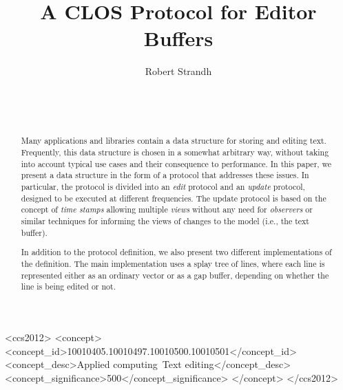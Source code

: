 \documentclass{sig-alternate-05-2015}
\def\inputtex#1{}
\begin{document}
\title{A CLOS Protocol for Editor Buffers}
\author{\alignauthor
Robert Strandh\\
\\
\\
\\
}

\maketitle

\begin{abstract}
Many applications and libraries contain a data structure for storing
and editing text.  Frequently, this data structure is chosen in a
somewhat arbitrary way, without taking into account typical use cases
and their consequence to performance.  In this paper, we present a
data structure in the form of a \clos{} protocol that addresses these
issues.  In particular, the protocol is divided into an \emph{edit}
protocol and an \emph{update} protocol, designed to be executed at
different frequencies.  The update protocol is based on the concept of
\emph{time stamps} allowing multiple \emph{views} without any need for
\emph{observers} or similar techniques for informing the views of
changes to the model (i.e., the text buffer).

In addition to the protocol definition, we also present two different
implementations of the definition.  The main implementation uses a splay
tree of lines, where each line is represented either as an ordinary
vector or as a gap buffer, depending on whether the line is being
edited or not.
\end{abstract}

\begin{CCSXML}
  <ccs2012>
  <concept>
  <concept_id>10010405.10010497.10010500.10010501</concept_id>
  <concept_desc>Applied computing~Text editing</concept_desc>
  <concept_significance>500</concept_significance>
  </concept>
  </ccs2012>
\end{CCSXML}


\printccsdesc


\inputtex{spec-macros.tex}

\inputtex{sec-introduction.tex}
\inputtex{sec-previous.tex}
\inputtex{sec-our-method.tex}
\inputtex{sec-benefits.tex}
\inputtex{sec-conclusions.tex}
\inputtex{sec-acknowledgments.tex}
\inputtex{app-protocol.tex}



\end{document}
